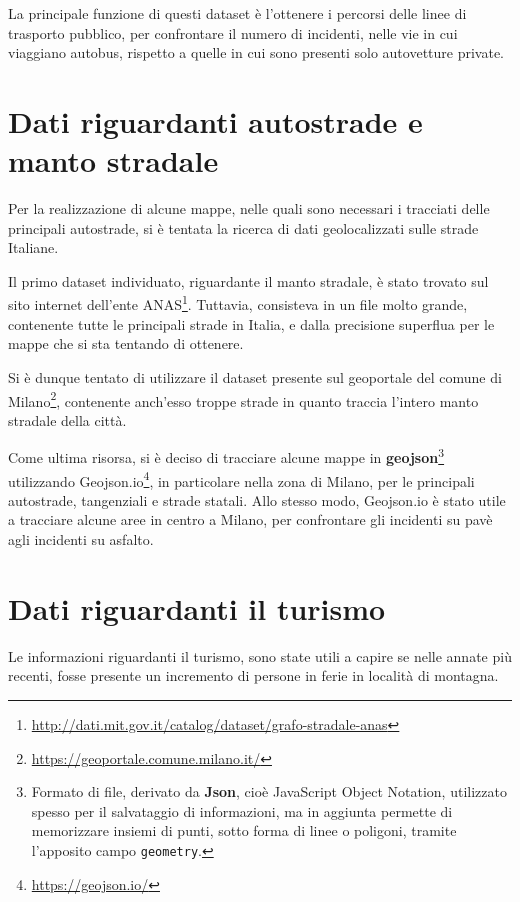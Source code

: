 \documentclass[a4paper,12pt]{report}
\newcommand{\columnstyle}[1]{\texttt{#1}}
\begin{document}
La principale funzione di questi dataset è l'ottenere i percorsi delle linee di trasporto pubblico, 
per confrontare il numero di incidenti, nelle vie in cui viaggiano autobus, rispetto a 
quelle in cui sono presenti solo autovetture private.

\section{Dati riguardanti autostrade e manto stradale}

Per la realizzazione di alcune mappe, nelle quali sono necessari i tracciati delle principali 
autostrade, si è tentata la ricerca di dati geolocalizzati sulle strade Italiane.

Il primo dataset individuato, riguardante il manto  stradale, è stato trovato sul sito 
internet dell'ente  
ANAS\footnote{\url{http://dati.mit.gov.it/catalog/dataset/grafo-stradale-anas}}. 
Tuttavia, consisteva in un file molto grande, contenente tutte le principali 
strade in Italia, e dalla precisione superflua per le mappe che si sta tentando di ottenere.

Si è dunque tentato di utilizzare il dataset presente sul geoportale del comune di 
Milano\footnote{\url{https://geoportale.comune.milano.it/}}, 
contenente anch'esso troppe strade in quanto traccia l'intero manto stradale della città.

Come ultima risorsa, si è deciso di tracciare alcune mappe in 
\textbf{geojson}\footnote{Formato di file, derivato da \textbf{Json}, cioè 
JavaScript Object Notation, utilizzato spesso per il salvataggio di informazioni, ma 
in aggiunta permette di memorizzare insiemi di punti, sotto forma di linee o poligoni, 
tramite l'apposito campo \columnstyle{geometry}.} utilizzando 
Geojson.io\footnote{\url{https://geojson.io/}}, in particolare nella zona di Milano, 
per le principali autostrade, tangenziali e strade statali. 
Allo stesso modo, Geojson.io è stato utile a tracciare alcune aree in centro a Milano, 
per confrontare gli incidenti su pavè agli incidenti su asfalto.

\section{Dati riguardanti il turismo}

Le informazioni riguardanti il turismo, sono state utili a capire se nelle annate più 
recenti, fosse presente un incremento di persone in ferie in località di montagna.
\end{document}
